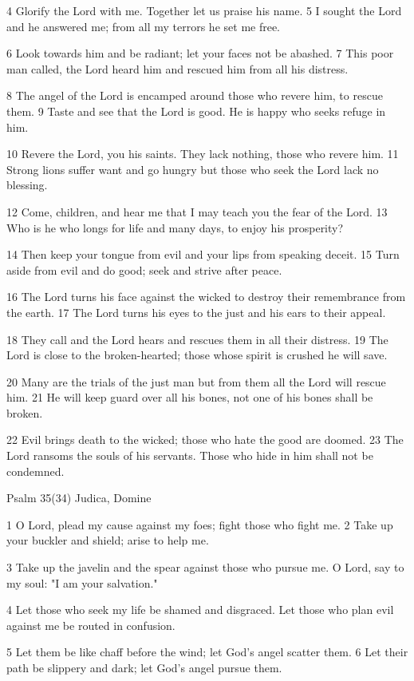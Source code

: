 4 Glorify the Lord with me.
Together let us praise his name.
5 I sought the Lord and he answered me;
from all my terrors he set me free.

6 Look towards him and be radiant;
let your faces not be abashed.
7 This poor man called, the Lord heard him
and rescued him from all his distress.

8 The angel of the Lord is encamped
around those who revere him, to rescue them.
9 Taste and see that the Lord is good.
He is happy who seeks refuge in him.

10 Revere the Lord, you his saints.
They lack nothing, those who revere him.
11 Strong lions suffer want and go hungry
but those who seek the Lord lack no blessing.

12 Come, children, and hear me
that I may teach you the fear of the Lord.
13 Who is he who longs for life
and many days, to enjoy his prosperity?

14 Then keep your tongue from evil
and your lips from speaking deceit.
15 Turn aside from evil and do good;
seek and strive after peace.

16 The Lord turns his face against the wicked
to destroy their remembrance from the earth.
17 The Lord turns his eyes to the just
and his ears to their appeal.

18 They call and the Lord hears
and rescues them in all their distress.
19 The Lord is close to the broken-hearted;
those whose spirit is crushed he will save.

20 Many are the trials of the just man
but from them all the Lord will rescue him.
21 He will keep guard over all his bones,
not one of his bones shall be broken.

22 Evil brings death to the wicked;
those who hate the good are doomed.
23 The Lord ransoms the souls of his servants.
Those who hide in him shall not be condemned.


Psalm 35(34) Judica, Domine

1 O Lord, plead my cause against my foes;
fight those who fight me.
2 Take up your buckler and shield;
arise to help me.

3 Take up the javelin and the spear
against those who pursue me.
O Lord, say to my soul:
"I am your salvation."

4 Let those who seek my life
be shamed and disgraced.
Let those who plan evil against me
be routed in confusion.

5 Let them be like chaff before the wind;
let God's angel scatter them.
6 Let their path be slippery and dark;
let God's angel pursue them.

